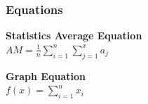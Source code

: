 \subsubsection{Equations}
\begin{description}
	\item{\textbf{Statistics Average Equation}}\hfill\\
		\(AM = \frac{1}{n}\displaystyle\sum_{i=1}^{n}\displaystyle\sum_{j=1}^{x} a_j \)
	\item{\textbf{Graph Equation}}\hfill\\
		\(f(x) = \displaystyle\sum_{i=1}^{n} x_i \)
\end{description}

